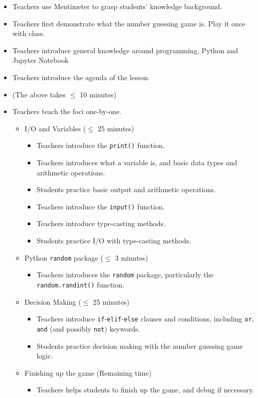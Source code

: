 \documentclass{article}
\def\T{Teachers }
\def\S{Students }
\def\s{students }
\begin{document}
\begin{itemize}
\item \T use Mentimeter to grasp students' knowledge background.

\item \T first demonstrate what the number guessing game is. Play it once with class.

\item \T introduce general knowledge around programming, Python and Jupyter Notebook

\item \T introduce the agenda of the lesson.

\item[] (The above takes $\leq$ 10 minutes)

\item \T teach the foci one-by-one.
	\begin{itemize}
		\item I/O and Variables ($\leq$ 25 minutes)
		\begin{itemize}
			\item \T introduce the \texttt{print()} function.
			\item \T introduces what a variable is, and basic data types and arithmetic operations.
			\item \S practice basic output and arithmetic operations.
			\item \T introduce the \texttt{input()} function.
			\item \T introduce type-casting methods.
			\item \S practice I/O with type-casting methods.
		\end{itemize}
		\item Python \texttt{random} package ($\leq$ 3 minutes)
		\begin{itemize}
			\item \T introduces the \texttt{random} package, particularly the \texttt{random.randint()} function.
		\end{itemize}
		\item Decision Making ($\leq$ 25 minutes)
		\begin{itemize}
			\item \T introduce \texttt{if}-\texttt{elif}-\texttt{else} clauses and conditions, including \texttt{or}, \texttt{and} (and possibly \texttt{not}) keywords.
			\item \S practice decision making with the number guessing game logic.
		\end{itemize}
		\item Finishing up the game (Remaining time)
		\begin{itemize}
			\item \T helps \s to finish up the game, and debug if necessary.
		\end{itemize}
	\end{itemize}


\end{itemize}
\end{document}
